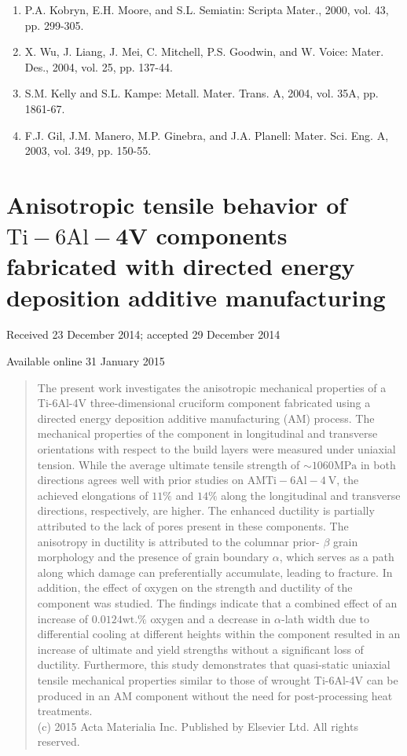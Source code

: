 \documentclass[10pt]{article}
\begin{document}
\begin{enumerate}
  \item P.A. Kobryn, E.H. Moore, and S.L. Semiatin: Scripta Mater., 2000, vol. 43, pp. 299-305.

  \item X. Wu, J. Liang, J. Mei, C. Mitchell, P.S. Goodwin, and W. Voice: Mater. Des., 2004, vol. 25, pp. 137-44.

  \item S.M. Kelly and S.L. Kampe: Metall. Mater. Trans. A, 2004, vol. 35A, pp. 1861-67.

  \item F.J. Gil, J.M. Manero, M.P. Ginebra, and J.A. Planell: Mater. Sci. Eng. A, 2003, vol. 349, pp. 150-55.

\end{enumerate}

\section*{Anisotropic tensile behavior of $\mathrm{Ti}-6 \mathrm{Al}-\mathbf{4 V}$ components fabricated with directed energy deposition additive manufacturing }
Received 23 December 2014; accepted 29 December 2014

Available online 31 January 2015

\begin{abstract}
The present work investigates the anisotropic mechanical properties of a Ti-6Al-4V three-dimensional cruciform component fabricated using a directed energy deposition additive manufacturing (AM) process. The mechanical properties of the component in longitudinal and transverse orientations with respect to the build layers were measured under uniaxial tension. While the average ultimate tensile strength of $\sim 1060 \mathrm{MPa}$ in both directions agrees well with prior studies on $\mathrm{AM} \mathrm{Ti}-6 \mathrm{Al}-4 \mathrm{~V}$, the achieved elongations of $11 \%$ and $14 \%$ along the longitudinal and transverse directions, respectively, are higher. The enhanced ductility is partially attributed to the lack of pores present in these components. The anisotropy in ductility is attributed to the columnar prior- $\beta$ grain morphology and the presence of grain boundary $\alpha$, which serves as a path along which damage can preferentially accumulate, leading to fracture. In addition, the effect of oxygen on the strength and ductility of the component was studied. The findings indicate that a combined effect of an increase of $0.0124 \mathrm{wt} . \%$ oxygen and a decrease in $\alpha$-lath width due to differential cooling at different heights within the component resulted in an increase of ultimate and yield strengths without a significant loss of ductility. Furthermore, this study demonstrates that quasi-static uniaxial tensile mechanical properties similar to those of wrought Ti-6Al-4V can be produced in an AM component without the need for post-processing heat treatments.\\
(c) 2015 Acta Materialia Inc. Published by Elsevier Ltd. All rights reserved.
\end{abstract}
\end{document}
